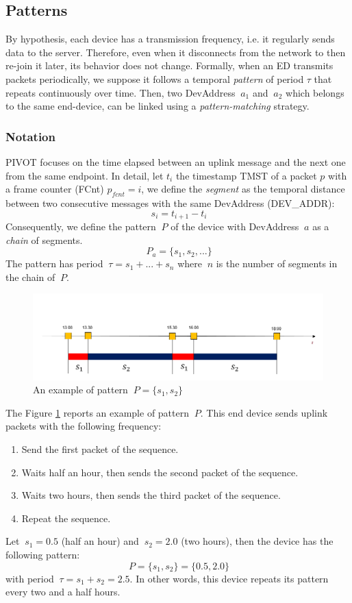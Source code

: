 \subsection{Patterns}
By hypothesis, each device has a transmission frequency, i.e. it regularly sends data to the server. Therefore, even when it disconnects from the network to then re-join it later, its behavior does not change. Formally, when an ED transmits packets periodically, we suppose it follows a temporal \textit{pattern} of period \(\tau\) that repeats continuously over time. Then, two DevAddress \(\ a_{1} \) and \(\ a_{2} \) which belongs to the same end-device, can be linked using a \textit{pattern-matching} strategy. 

\subsubsection{Notation}
PIVOT focuses on the time elapsed between an uplink message and the next one from the same endpoint.
In detail, let \(t_{i}\) the timestamp TMST of a packet \(p\) with a frame counter (FCnt) \(p_{fcnt} = i\), we define the \textit{segment} as the temporal distance between two consecutive messages with the same DevAddress (DEV\_ADDR):
\[\ s_{i} = t_{i+1} - t_{i} \]
Consequently, we define the pattern \(\ P \) of the device with DevAddress \(\ a \) as a \textit{chain} of segments.
\[\ P_{a} = \{ s_{1}, s_{2}, ... \}\]
The pattern has period \(\ \tau = s_{1} + ... + s_{n} \) where \(\ n \) is the number of segments in the chain of \(\ P \). 
\begin{figure}[H]
    \centering
    \vspace{4ex}%
    \includegraphics[width=0.7\linewidth]{images/pivot/pattern.PNG}
    \caption{An example of pattern \(\ P = \{ s_{1}, s_{2} \} \)}
    \vspace{4ex}%
    \label{fig:pattern}
\end{figure}
The Figure \ref{fig:pattern} reports an example of pattern \(\ P \). This end device sends uplink packets with the following frequency:
\begin{enumerate}
	\item Send the first packet of the sequence.
	\item Waits half an hour, then sends the second packet of the sequence.
	\item Waits two hours, then sends the third packet of the sequence.
	\item Repeat the sequence.
\end{enumerate}
Let \(\ s_{1} = 0.5 \) (half an hour) and \(\ s_{2} = 2.0 \) (two hours), then the device has the following pattern:
\[\ P = \{ s_{1}, s_{2} \} = \{ \textit{0.5}, \textit{2.0} \}\]
with period \(\ \tau = s_{1} + s_{2} = 2.5 \). In other words, this device repeats its pattern every two and a half hours.
\vspace{5mm}

